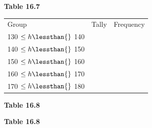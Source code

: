 \begin{description}[noitemsep]
\begin{description}[noitemsep]
\begin{enumerate}[noitemsep, label=\textbf{\arabic*}. ]
\begin{table}[H]
    \begin{caption}{\small\bfseries Table 16.7}\end{caption}
\end{table}
    \par
          \begin{table}[H]
        \begin{center}
      \label{m39403*id207774}
    \noindent
      \tablelasttail{}
      \begin{xtabular}[t]{|l|l|l|}\hline
        Group &
        Tally &
        Frequency%
     \tabularnewline{}
        130 $\leq h\lessthan{}$ 140 &
         &
     \tabularnewline{}
        140 $\leq h\lessthan{}$ 150 &
         &
     \tabularnewline{}
        150 $\leq h\lessthan{}$ 160 &
         &
     \tabularnewline{}
        160 $\leq h\lessthan{}$ 170 &
         &
     \tabularnewline{}
        170 $\leq h\lessthan{}$ 180 &
         &
     \tabularnewline{}
    \end{xtabular}
      \end{center}
    \begin{center}{\small\bfseries Table 16.8}\end{center}
    \begin{caption}{\small\bfseries Table 16.8}\end{caption}
\end{table}

\end{enumerate}
\end{description}
\end{description}
